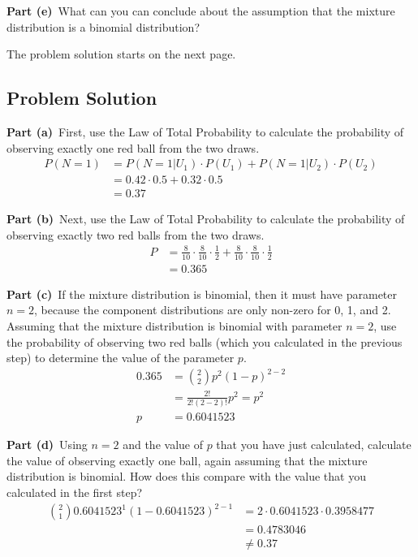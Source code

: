 \documentclass[12pt]{article}
\theoremstyle{definition}
\begin{document}
\bigskip
\noindent
{\bf Part (e)}\ What can you can conclude about the assumption that the mixture distribution is a binomial distribution?



\bigskip
\noindent
The problem solution starts on the next page.

\newpage
\subsection*{Problem Solution}

\noindent
{\bf Part (a)}\ First, use the Law of Total Probability to calculate the probability of observing exactly one red ball from the two draws.
\begin{align*}
P(N=1) &= P(N=1|U_1) \cdot P(U_1) + P(N=1|U_2) \cdot P(U_2)\\
&= 0.42 \cdot 0.5 + 0.32 \cdot 0.5\\
&= 0.37
\end{align*}

\vspace{3.5in}
\noindent
{\bf Part (b)}\ Next, use the Law of Total Probability to calculate the probability of observing exactly two red balls from the two draws.
\begin{align*}
P &= \frac{8}{10} \cdot \frac{8}{10}\cdot \frac{1}{2} + \frac{8}{10} \cdot \frac{8}{10}\cdot \frac{1}{2}\\
&= 0.365
\end{align*}


\newpage
\noindent
{\bf Part (c)}\ If the mixture distribution is binomial, then it must have parameter $n = 2$, because the component distributions are only non-zero for 0, 1, and 2. Assuming that the  mixture distribution is binomial with parameter $n = 2$, use the probability of observing two red balls (which you calculated in the previous step) to determine the value of the parameter $p$.
\begin{align*}
0.365 &= \binom{2}{2} p^2(1 - p) ^{2-2}\\
&= \frac{2!}{2!(2-2)!}p^2 = p^2\\
p&= 0.6041523
\end{align*}

\vspace{3in}
\noindent
{\bf Part (d)}\ Using $n = 2$ and the value of $p$ that you have just calculated, calculate the value of observing exactly one ball, again assuming that the mixture distribution is binomial. How does this compare with the value that you calculated in the first step?
\begin{align*}
\binom{2}{1}0.6041523^1(1-0.6041523)^{2-1} &= 2 \cdot 0.6041523 \cdot 0.3958477\\
&= 0.4783046\\
&\neq 0.37\\
\end{align*}
\end{document}

